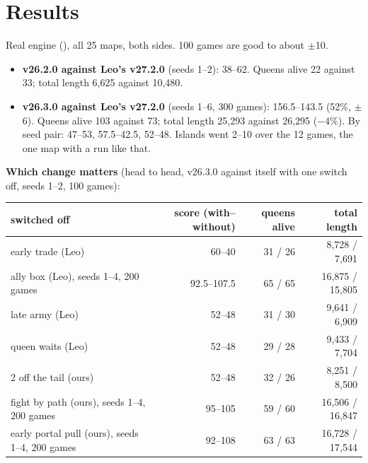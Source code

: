 \documentclass[11pt,a4paper]{article}
\newcommand{\code}[1]{\texttt{\detokenize{#1}}}
\begin{document}
\section{Results}\label{sec:mergeresults}
Real engine (\code{ubcrun}), all 25 maps, both sides. 100 games are good to about $\pm$10.
\begin{itemize}
  \item \textbf{v26.2.0 against Leo's v27.2.0} (seeds 1--2): 38--62. Queens alive 22 against 33; total length 6,625 against
        10,480.
  \item \textbf{v26.3.0 against Leo's v27.2.0} (seeds 1--6, 300 games): 156.5--143.5 (52\%, $\pm$6). Queens alive 103
        against 73; total length 25,293 against 26,295 ($-4\%$). By seed pair: 47--53, 57.5--42.5, 52--48. Islands went
        2--10 over the 12 games, the one map with a run like that.
\end{itemize}
\textbf{Which change matters} (head to head, v26.3.0 against itself with one switch off, seeds 1--2, 100 games):
\begin{center}
\begin{tabular}{lrrr}
  switched off & score (with--without) & queens alive & total length \\ \hline
  early trade (Leo) & 60--40 & 31 / 26 & 8,728 / 7,691 \\
  ally box (Leo), seeds 1--4, 200 games & 92.5--107.5 & 65 / 65 & 16,875 / 15,805 \\
  late army (Leo) & 52--48 & 31 / 30 & 9,641 / 6,909 \\
  queen waits (Leo) & 52--48 & 29 / 28 & 9,433 / 7,704 \\
  2 off the tail (ours) & 52--48 & 32 / 26 & 8,251 / 8,500 \\
  fight by path (ours), seeds 1--4, 200 games & 95--105 & 59 / 60 & 16,506 / 16,847 \\
  early portal pull (ours), seeds 1--4, 200 games & 92--108 & 63 / 63 & 16,728 / 17,544 \\
\end{tabular}
\end{center}
\end{document}
